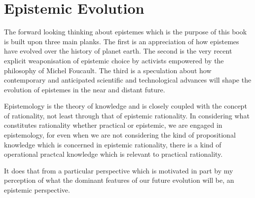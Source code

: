 \chapter{Epistemic Evolution}\label{EpistemicEvolution}

The forward looking thinking about epistemes which is the purpose of this book is built upon three main planks.
The first is an appreciation of how epistemes have evolved over the history of planet earth.
The second is the very recent explicit weaponisation of epistemic choice by activists empowered by the philosophy of Michel Foucault.
The third is a speculation about how contemporary and anticipated scientific and technological advances will shape the evolution of epistemes in the near and distant future.

Epistemology is the theory of knowledge and is closely coupled with the concept of rationality, not least through that of epistemic rationality.
In considering what constitutes rationality whether practical or epistemic, we are engaged in epistemology, for even when we are not considering the kind of propositional knowledge which is concerned in epistemic rationality, there is a kind of operational practcal knowledge which is relevant to practical rationality.

It does that from a particular perspective which is motivated in part by my perception of what the dominant features of our future evolution will be, an epistemic perspective.

